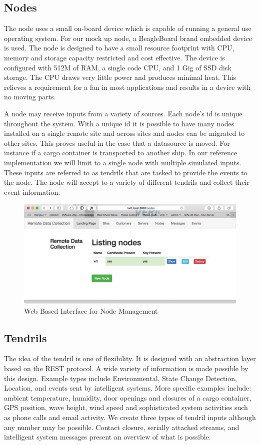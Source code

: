 \subsection{Nodes}
The node uses a small on-board device which is capable of running a general use operating system. For our mock up node, a BeagleBoard\cite{Anonymous:zgMDnVpL} brand embedded device is used.  The node is designed to have a small resource footprint with CPU, memory and storage capacity restricted and cost effective.  The device is configured with 512M of RAM, a single code CPU, and 1 Gig of SSD disk storage.  The CPU draws very little power and produces minimal heat.  This relieves a requirement for a fan in most applications and results in a device with no moving parts.  

A node may receive inputs from a variety of sources.  Each node's id is unique throughout the system.  With a unique id it is possible to have many nodes installed on a single remote site and across sites and nodes can be migrated to other sites. This proves useful in the case that a datasource is moved. For instance if a cargo container is transported to another ship. 
In our reference implementation we will limit to a single node with multiple simulated inputs.  These inputs are referred to as tendrils that are tasked to provide the events to the node.  The node will accept to a variety of different tendrils and collect their event information.  

\begin{figure}
    \centering
    \includegraphics[scale=.9, angle=0]{Figures/interfaceNodes}
    \caption[Nodes Interface]{Web Based Interface for Node Management}
    \label{fig:interfaceNodes}
\end{figure}

\subsection{Tendrils}
The idea of the tendril is one of flexibility. 
It is designed with an abstraction layer based on the REST protocol. A wide variety of information is made possible by this design. 
Example types include Environmental, State Change Detection, Location, and events sent by intelligent systems.  
More specific examples include: ambient temperature, humidity, door openings and closures of a cargo container, GPS position, wave height, wind speed and sophisticated system activities such as phone calls and email activity. We create three types of tendril inputs although any number may be possible. Contact closure, serially attached streams, and intelligent system messages present an overview of what is possible. 

